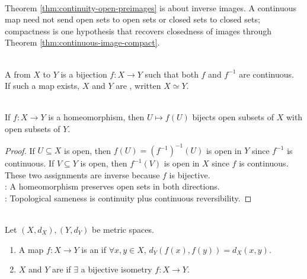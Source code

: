 \begin{remark} \label{rem:continuity-controls-preimages-not-images} \\
Theorem \ref{thm:continuity-open-preimages} is about inverse images. A continuous map need not send open sets to open sets or closed sets to closed sets; compactness is one hypothesis that recovers closedness of images through Theorem \ref{thm:continuous-image-compact}.
\end{remark}

\begin{definition} \label{def:homeomorphism} \\
A  from $X$ to $Y$ is a bijection $f:X\to Y$ such that both $f$ and $f^{-1}$ are continuous.\\
If such a map exists, $X$ and $Y$ are , written $X\simeq Y$.
\end{definition}

\begin{proposition} \label{prop:homeomorphisms-preserve-topology} \\
If $f:X\to Y$ is a homeomorphism, then $U\mapsto f(U)$ bijects open subsets of $X$ with open subsets of $Y$.
\begin{proof}
If $U\subseteq X$ is open, then $f(U)=(f^{-1})^{-1}(U)$ is open in $Y$ since $f^{-1}$ is continuous. If $V\subseteq Y$ is open, then $f^{-1}(V)$ is open in $X$ since $f$ is continuous. These two assignments are inverse because $f$ is bijective.\\
: A homeomorphism preserves open sets in both directions.\\
: Topological sameness is continuity plus continuous reversibility.
\end{proof}
\end{proposition}

\begin{definition} \label{def:metric-isometry} \\
Let $(X,d_X),(Y,d_Y)$ be metric spaces.
\begin{enumerate}[label=(\roman*)]
\setlength{\itemsep}{0pt}
\item A map $f:X\to Y$ is an  if $\forall x,y\in X$, $d_Y(f(x),f(y))=d_X(x,y)$.
\item $X$ and $Y$ are  if $\exists$ a bijective isometry $f:X\to Y$.
\end{enumerate}
\end{definition}

